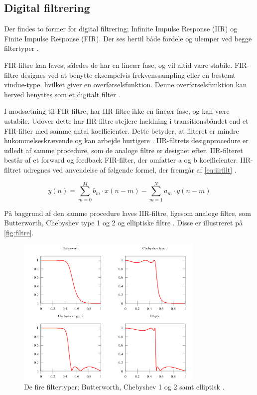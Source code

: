 \subsection{Digital filtrering} \label{sec:teori_filter}
Der findes to former for digital filtrering; Infinite Impulse Response (IIR) og Finite Impulse Response (FIR). Der ses hertil både fordele og ulemper ved begge filtertyper \citep{blandford2012}.

FIR-filtre kan laves, således de har en lineær fase, og vil altid være stabile. 
FIR-filtre designes ved at benytte eksempelvis frekvenssampling eller en bestemt vindue-type, hvilket giver en overførselsfunktion. 
Denne overførselsfunktion kan herved benyttes som et digitalt filter \citep{blandford2012}. 

I modsætning til FIR-filtre, har IIR-filtre ikke en lineær fase, og kan være ustabile. 
Udover dette har IIR-filtre stejlere hældning i transitionsbåndet end et FIR-filter med samme antal koefficienter. 
Dette betyder, at filteret er mindre hukommelseskrævende og kan arbejde hurtigere \citep{blandford2012}. 
IIR-filtrets designprocedure er udledt af samme procedure, som de analoge filtre er designet efter.
IIR-filteret består af et forward og feedback FIR-filter, der omfatter a og b koefficienter. 
IIR-filtret udregnes ved anvendelse af følgende formel, der fremgår af \autoref{eq:iirfilt} \citep{francis2009}. 

\begin{equation} \label{eq:iirfilt}
	y(n)= \sum_{m=0}^{M} b_{m} \cdot x(n-m)- \sum^{N}_{m=1} a_{m} \cdot y(n-m)
\end{equation}

\noindent
På baggrund af den samme procedure laves IIR-filtre, ligesom analoge filtre, som Butterworth, Chebyshev type 1 og 2 og elliptiske filtre \citep{blandford2012}. Disse er illustreret på \autoref{fig:filtre}.

\begin{figure}[H]
\centering
\includegraphics[width=0.8\textwidth]{figures/filtre}
\caption{De fire filtertyper; Butterworth, Chebyshev 1 og 2 samt elliptisk \citep{wikipedia2016}.}
\label{fig:filtre}
\end{figure}

